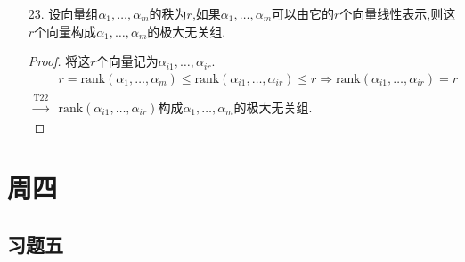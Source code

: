 \documentclass{article}
\begin{document}
\begin{enumerate}
    \begin{proof}
        设有任何$r$个线性无关的向量$\alpha_{i1},\ldots,\alpha_{ir}$构成一个向量组$S_1$,$\forall\ \alpha_{j}\notin S_1,S_2=S_1\cup \left\{\alpha_{j}\right\}$.
        \[
            r+1>r=\mbox{rank}(\alpha_1,\ldots,\alpha_m)
            \Rightarrow
            S_2\mbox{线性相关},\mbox{又}S_1\mbox{线性无关}
            \Rightarrow
            S_1\mbox{构成}\alpha_1,\ldots,\alpha_m\mbox{的极大无关组}.
        \]
    \end{proof}
    \item [23.]设向量组$\alpha_1,\ldots,\alpha_m$的秩为$r$,如果$\alpha_1,\ldots,\alpha_m$可以由它的$r$个向量线性表示,则这$r$个向量构成$\alpha_1,\ldots,\alpha_m$的极大无关组.
    \begin{proof}将这$r$个向量记为$\alpha_{i1},\ldots,\alpha_{ir}$.
        \begin{align*}
            & r=\mbox{rank}(\alpha_1,\ldots,\alpha_m)
            \leqslant
            \mbox{rank}(\alpha_{i1},\ldots,\alpha_{ir})
            \leqslant r
            \Rightarrow
            \mbox{rank}(\alpha_{i1},\ldots,\alpha_{ir})=r\\
            \xrightarrow{\mbox{T22结论}}
            & \mbox{rank}(\alpha_{i1},\ldots,\alpha_{ir})\mbox{构成}
            \alpha_1,\ldots,\alpha_m\mbox{的极大无关组}.
        \end{align*}
    \end{proof}
\end{enumerate}
\section{周四}
\subsection{习题五}
\end{document}
